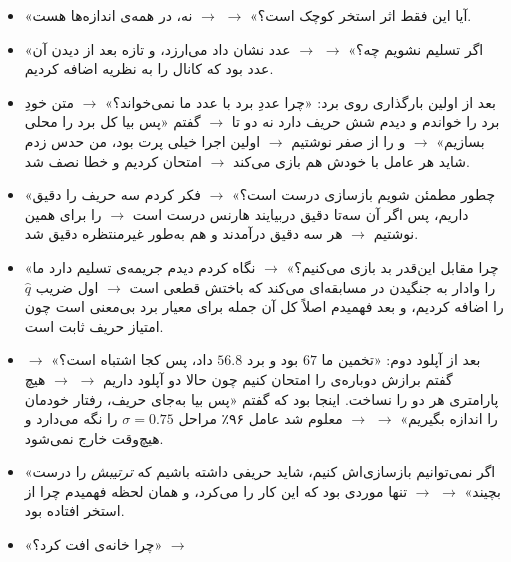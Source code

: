 \documentclass[12pt,a4paper]{article}
\begin{document}
\begin{itemize}[leftmargin=1.4em,itemsep=3pt]
\begin{itemize}[leftmargin=1.2em,itemsep=1pt]
                $\to$ معلوم شد معیار به دو مسئله‌ی مستقل تجزیه می‌شود.
          \item «آیا این فقط اثر استخر کوچک است؟» $\to$ 
                $\to$ نه، در همه‌ی اندازه‌ها هست.
          \item «اگر تسلیم نشویم چه؟» $\to$  $\to$
                عدد نشان داد می‌ارزد، و تازه بعد از دیدن آن عدد بود که
                کانال  را به نظریه اضافه کردیم.
          \item بعد از اولین بارگذاری روی برد: «چرا عددِ برد با عدد ما
                نمی‌خواند؟» $\to$ متن خودِ برد را خواندم و دیدم شش حریف
                دارد نه دو تا $\to$ گفتم «پس بیا کل برد را محلی بسازیم»
                $\to$  و  را از صفر
                نوشتیم $\to$ اولین اجرا خیلی پرت بود، من حدس زدم شاید هر
                عامل با خودش هم بازی می‌کند $\to$ امتحان کردیم و خطا
                نصف شد.
          \item «چطور مطمئن شویم بازسازی درست است؟» $\to$ فکر کردم سه
                حریف را دقیق داریم، پس اگر آن سه‌تا دقیق دربیایند
                هارنس درست است $\to$  را برای همین
                نوشتیم $\to$ هر سه دقیق درآمدند و  هم به‌طور
                غیرمنتظره دقیق شد.
          \item «چرا مقابل  این‌قدر بد بازی می‌کنیم؟» $\to$
                نگاه کردم دیدم جریمه‌ی تسلیم دارد ما را وادار به جنگیدن
                در مسابقه‌ای می‌کند که باختش قطعی است $\to$ اول ضریب
                $\hat q$ را اضافه کردیم، و بعد فهمیدم اصلاً کل آن جمله
                برای معیار برد بی‌معنی است چون امتیاز حریف ثابت است.
          \item بعد از آپلود دوم: «تخمین ما $67$ بود و برد $56.8$ داد، پس
                کجا اشتباه است؟» $\to$ گفتم برازش دوباره‌ی  را
                امتحان کنیم چون حالا دو آپلود داریم $\to$
                 $\to$ هیچ پارامتری هر دو را
                نساخت. اینجا بود که گفتم «پس بیا به‌جای حریف، رفتار خودمان
                را اندازه بگیریم» $\to$  $\to$ معلوم شد
                عامل ۹۶٪ مراحل $\sigma=0.75$ را نگه می‌دارد و هیچ‌وقت
                خارج نمی‌شود.
          \item «اگر نمی‌توانیم بازسازی‌اش کنیم، شاید حریفی داشته باشیم که
                \emph{ترتیبش} را درست بچیند» $\to$ 
                $\to$  تنها موردی بود که این کار را می‌کرد، و
                همان لحظه فهمیدم چرا از استخر افتاده بود.
          \item «چرا خانه‌ی  افت کرد؟» $\to$ 

\end{itemize}
\end{itemize}
\end{document}
